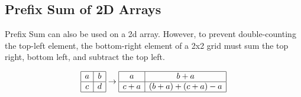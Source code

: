 \subsection*{Prefix Sum of 2D Arrays}
    Prefix Sum can also be used on a 2d array. However, to prevent double-counting the top-left element, the bottom-right element of a 2x2 grid must sum the top right, bottom left, and subtract the top left.

    \[
        \begin{array}{|c|c|}
        \hline
        a & b \\
        \hline
        c & d \\
        \hline
        \end{array}
        \rightarrow
        \begin{array}{|c|c|}
        \hline
        a & b + a \\
        \hline
        c + a & (b + a) + (c + a) - a \\
        \hline
        \end{array}
    \]